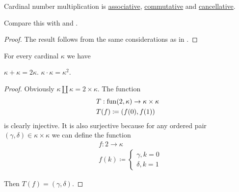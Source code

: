 \begin{proposition}\label{thm:cardinal_multiplication_algebraic_properties}
  Cardinal number multiplication is \hyperref[def:binary_operation/associative]{associative}, \hyperref[def:binary_operation/associative]{commutative} and \hyperref[def:binary_operation/cancellative]{cancellative}.

  Compare this with  and .
\end{proposition}
\begin{proof}
  The result follows from the same considerations as in .
\end{proof}

\begin{proposition}\label{thm:double_and_square_of_cardinal}
  For every cardinal \( \kappa \) we have
  \begin{thmenum}
     \( \kappa + \kappa = 2\kappa \).
     \( \kappa \cdot \kappa = \kappa^2 \).
  \end{thmenum}
\end{proposition}
\begin{proof}
   Obviously \( \kappa \amalg \kappa = 2 \times \kappa \).
   The function
  \begin{equation*}
    \begin{aligned}
      &T: \operatorname{fun}(2, \kappa) \to \kappa \times \kappa \\
      &T(f) \coloneqq (f(0), f(1))
    \end{aligned}
  \end{equation*}
  is clearly injective. It is also surjective because for any ordered pair \( (\gamma, \delta) \in \kappa \times \kappa \) we can define the function
  \begin{equation*}
    \begin{aligned}
      &f: 2 \to \kappa \\
      &f(k) \coloneqq \begin{cases}
        \gamma, k = 0 \\
        \delta, k = 1
      \end{cases}
    \end{aligned}
  \end{equation*}

  Then \( T(f) = (\gamma, \delta) \).
\end{proof}

